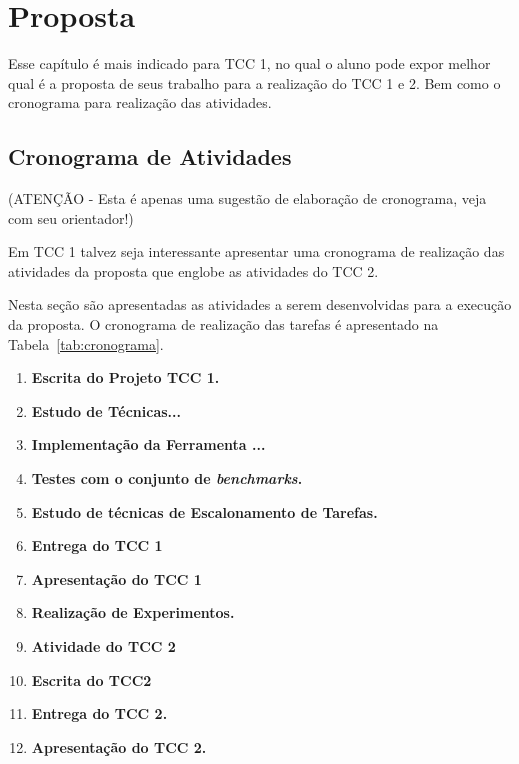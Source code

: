 \chapter{Proposta}
\label{cap:proposta}

Esse capítulo é mais indicado para TCC 1, no qual o aluno pode expor melhor qual é a proposta de seus trabalho para a realização do TCC 1 e 2. Bem como o cronograma para realização das atividades.

\section{Cronograma de Atividades}
\label{cap:proposta:sec:cronograma}

(ATENÇÃO - Esta é apenas uma sugestão de elaboração de cronograma, veja com seu orientador!)

Em TCC 1 talvez seja interessante apresentar uma cronograma de realização das atividades da proposta que englobe as atividades do TCC 2.

Nesta seção são apresentadas as atividades a serem desenvolvidas para a execução da proposta. O cronograma de realização das tarefas é apresentado na Tabela~\ref{tab:cronograma}.

\begin{enumerate}
\item \textbf{Escrita do Projeto TCC 1.}
\item \textbf{Estudo de Técnicas...}
\item \textbf{Implementação da Ferramenta ...}
\item \textbf{Testes com o conjunto de \textit{benchmarks}.}
\item \textbf{Estudo de técnicas de Escalonamento de Tarefas.}
\item \textbf{Entrega do TCC 1}
\item \textbf{Apresentação do TCC 1}
\item \textbf{Realização de Experimentos.}
\item \textbf{Atividade do TCC 2}
\item \textbf{Escrita do TCC2}
\item \textbf{Entrega do TCC 2.}
\item \textbf{Apresentação do TCC 2.}
\end{enumerate}

